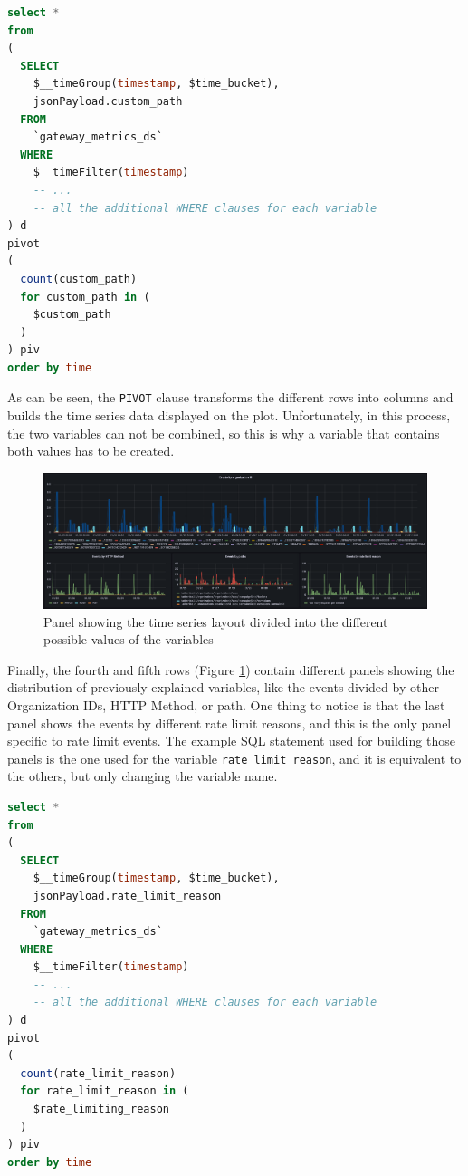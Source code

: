 \documentclass[english, 12pt, a4paper, sci, utf8, a-1b, online]{aaltothesis}
\begin{document}
\begin{lstlisting}[language=sql,firstnumber=1]
select *
from
(
  SELECT
    $__timeGroup(timestamp, $time_bucket),
    jsonPayload.custom_path
  FROM 
    `gateway_metrics_ds`
  WHERE 
    $__timeFilter(timestamp)
    -- ...
    -- all the additional WHERE clauses for each variable
) d
pivot
(
  count(custom_path)
  for custom_path in (
    $custom_path
  )
) piv
order by time
\end{lstlisting}

As can be seen, the \texttt{PIVOT} clause transforms the different rows into columns and builds the time series data displayed on the plot. Unfortunately, in this process, the two variables can not be combined, so this is why a variable that contains both values has to be created.\\

\begin{figure}[h]
    \centering
    \includegraphics[scale=0.24]{src/thesis/img/technical-solution/grafana-dashboard/row-4.png}
    \caption{Panel showing the time series layout divided into the different possible values of the variables}
    \label{fig:grafana-row-4}
\end{figure}

Finally, the fourth and fifth rows (Figure \ref{fig:grafana-row-4}) contain different panels showing the distribution of previously explained variables, like the events divided by other Organization IDs, HTTP Method, or path. One thing to notice is that the last panel shows the events by different rate limit reasons, and this is the only panel specific to rate limit events. The example SQL statement used for building those panels is the one used for the variable \texttt{rate\_limit\_reason}, and it is equivalent to the others, but only changing the variable name.\\

\begin{lstlisting}[language=sql,firstnumber=1]
select *
from
(
  SELECT
    $__timeGroup(timestamp, $time_bucket),
    jsonPayload.rate_limit_reason
  FROM 
    `gateway_metrics_ds`
  WHERE 
    $__timeFilter(timestamp)
    -- ...
    -- all the additional WHERE clauses for each variable
) d
pivot
(
  count(rate_limit_reason)
  for rate_limit_reason in (
    $rate_limiting_reason
  )
) piv
order by time
\end{lstlisting}
\end{document}
